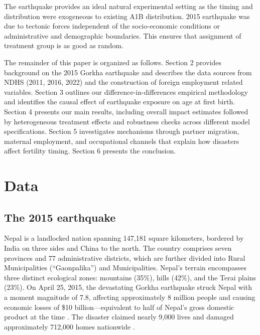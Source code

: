 \documentclass[11pt,a4paper]{article}
\begin{document}

\vspace{0.25cm}

The earthquake provides an ideal natural experimental setting as the timing and distribution were exogeneous to existing A1B distribution. 2015 earthquake was due to tectonic forces independent of the socio-economic conditions or administrative and demographic boundaries. This ensures that assignment of treatment group is as good as random.

\vspace{0.25 cm}

The remainder of this paper is organized as follows. Section 2 provides background on the 2015 Gorkha earthquake and describes the data sources from NDHS (2011, 2016, 2022) and the construction of foreign employment related variables. Section 3 outlines our difference-in-differences empirical methodology and identifies the causal effect of earthquake exposure on age at first birth. Section 4 presents our main results, including overall impact estimates followed by heterogeneous treatment effects and robustness checks across different model specifications. Section 5 investigates mechanisms through partner migration, maternal employment, and occupational channels that explain how disasters affect fertility timing.  Section 6 presents the conclusion.

\section{Data}



\subsection{The 2015 earthquake} 


Nepal is a landlocked nation spanning 147,181 square kilometers, bordered by India on three sides and China to the north. The country comprises seven provinces and 77 administrative districts, which are further divided into Rural Municipalities (``Gaonpalika'') and Municipalities. Nepal's terrain encompasses three distinct ecological zones: mountains (35\%), hills (42\%), and the Terai plains (23\%).
On April 25, 2015, the devastating Gorkha earthquake struck Nepal with a moment magnitude of 7.8, affecting approximately 8 million people and causing economic losses of \$10 billion—equivalent to half of Nepal's gross domestic product at the time \citep{paudel2023spillover}. The disaster claimed nearly 9,000 lives and damaged approximately 712,000 homes nationwide \citep{shakya2022natural}. 
\end{document}
